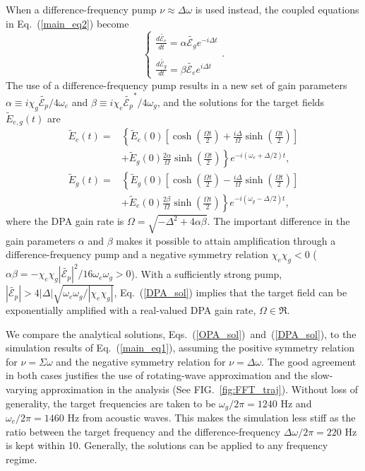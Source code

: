 \documentclass[aps,prl,nobibnotes,nofootinbib,showpacs,reprint]{revtex4-1}
\newcommand{\Fig}[1]{FIG.~\ref{#1}}
\newcommand{\Eq}[1]{Eq.~(\ref{#1})}
\newcommand{\Eqs}[2]{Eqs.~(\ref{#1})~and~(\ref{#2})}
\newcommand{\Ep}{\tilde{\mathcal{E}_{p}}}
\newcommand{\Ee}{\tilde{\mathcal{E}_{e}}}
\newcommand{\Eg}{\tilde{\mathcal{E}_{g}}}
\newcommand{\we}{\omega_{e}}
\newcommand{\wg}{\omega_{g}}
\newcommand{\chie}{\chi_{e}}
\newcommand{\chig}{\chi_{g}}
\newcommand{\Dw}{\Delta \omega}
\newcommand{\Sw}{\Sigma \omega}
\newcommand{\Dv}{\Delta}
\newcommand{\Wm}{\Omega}
\newcommand{\alp}{\alpha}
\newcommand{\bta}{\beta}
\begin{document}
When a difference-frequency pump $\nu \approx \Dw$ is used instead, the coupled equations in \Eq{main_eq2} become
\begin{equation}\label{DPA_eq}
	\left\{
	\begin{array}{l}
	\displaystyle  \frac{d\Ee}{dt} = \alp \Eg e^{-i\Dv t} 	\\	\\
	\displaystyle  \frac{d\Eg}{dt} = \bta \Ee e^{i\Dv t} 
	\end{array}
	\right. .
\end{equation}
The use of a difference-frequency pump results in a new set of gain parameters $\alp \equiv i\chig\Ep/4\we$ and $\bta \equiv i\chie\Ep^{\ast}/4\wg$, and the solutions for the target fields $\tilde{E}_{e,g}(t)$ are
\begin{equation}\label{DPA_sol}
	\begin{split}
	 \tilde{E}_{e}(t)  =& \left\{ \tilde{E}_{e}(0) \left[ \cosh{\left( \frac{\Wm t}{2} \right)} + \frac{i\Dv}{\Wm}\sinh{\left( \frac{\Wm t}{2} \right)} \right] \right.	\\
	 		&\left. + \tilde{E}_{g}(0) \frac{2\alp}{\Wm}\sinh{\left( \frac{\Wm t}{2} \right)} \right\}e^{-i(\we+\Dv/2)t}	,\\	
	\tilde{E}_{g}(t)  =& \left\{ \tilde{E}_{g}(0) \left[ \cosh{\left( \frac{\Wm t}{2} \right)} - \frac{i\Dv}{\Wm}\sinh{\left( \frac{\Wm t}{2} \right)} \right] \right. 	\\
 		&\left.  + \tilde{E}_{e}(0) \frac{2\bta}{\Wm}\sinh{\left( \frac{\Wm t}{2} \right)} \right\}e^{-i(\wg-\Dv/2)t}	,
	\end{split}
\end{equation}
where the DPA gain rate is $\Wm = \sqrt{-\Dv^2+4\alp\bta}$. The important difference in the gain parameters $\alp$ and $\bta$ makes it possible to attain amplification through a difference-frequency pump and a negative symmetry relation $\chie\chig < 0$ ($\alp\bta = -\chie\chig|\Ep|^2/16\we\wg > 0$). With a sufficiently strong pump, $|\Ep| > 4|\Dv|\sqrt{\we\wg/|\chie\chig|}$, \Eq{DPA_sol} implies that the target field can be exponentially amplified with a real-valued DPA gain rate, $\Wm \in \Re$.


We compare the analytical solutions, \Eqs{OPA_sol}{DPA_sol}, to the simulation results of \Eq{main_eq1}, assuming the positive symmetry relation for $\nu = \Sw$ and the negative symmetry relation for $\nu = \Dw$. The good agreement in both cases justifies the use of rotating-wave approximation and the slow-varying approximation in the analysis (See \Fig{fig:FFT_traj}). Without loss of generality, the target frequencies are taken to be $\wg/2\pi = 1240$ Hz and $\we/2\pi = 1460$ Hz from acoustic waves. This makes the simulation less stiff as the ratio between the target frequency and the difference-frequency $\Dw/2\pi = 220$ Hz is kept within 10. Generally, the solutions can be applied to any frequency regime. 
\end{document}
